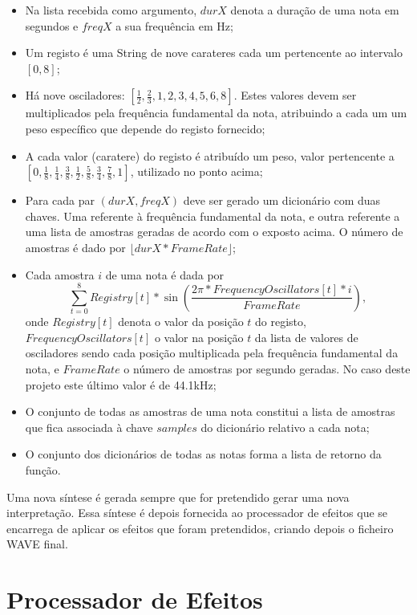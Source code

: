\documentclass[a4paper,11pt,openright,oneside]{report}
\begin{document}
\begin{itemize}
\item Na lista recebida como argumento, $durX$ denota a duração de uma nota em segundos e $freqX$ a sua frequência em Hz;
\item Um registo é uma String de nove carateres cada um pertencente ao intervalo $[0, 8]$;
\item Há nove osciladores: $\left[\frac{1}{2}, \frac{2}{3}, 1, 2, 3, 4, 5, 6, 8\right]$. Estes valores devem ser multiplicados pela frequência fundamental da nota, atribuindo a cada um um peso específico que depende do registo fornecido;
\item A cada valor (caratere) do registo é atribuído um peso, valor pertencente a $\left[0, \frac{1}{8}, \frac{1}{4}, \frac{3}{8}, \frac{1}{2}, \frac{5}{8}, \frac{3}{4}, \frac{7}{8}, 1\right]$, utilizado no ponto acima;
\item Para cada par $(durX, freqX)$ deve ser gerado um dicionário com duas chaves. Uma referente à frequência fundamental da nota, e outra referente a uma lista de amostras geradas de acordo com o exposto acima. O número de amostras é dado por $\lfloor durX * FrameRate \rfloor$;
\item Cada amostra $i$ de uma nota é dada por
$$\sum_{t=0}^8 Registry[t] * \sin \left(\frac{2\pi * FrequencyOscillators[t] * i}{FrameRate}\right),$$
onde $Registry[t]$ denota o valor da posição $t$ do registo, $FrequencyOscillators[t]$ o valor na posição $t$ da lista de valores de osciladores sendo cada posição multiplicada pela frequência fundamental da nota, e $FrameRate$ o número de amostras por segundo geradas. No caso deste projeto este último valor é de 44.1kHz;
\item O conjunto de todas as amostras de uma nota constitui a lista de amostras que fica associada à chave $samples$ do dicionário relativo a cada nota;
\item O conjunto dos dicionários de todas as notas forma a lista de retorno da função.
\end{itemize}

Uma nova síntese é gerada sempre que for pretendido gerar uma nova interpretação. Essa síntese é depois fornecida ao processador de efeitos que se encarrega de aplicar os efeitos que foram pretendidos, criando depois o ficheiro WAVE final.

\section{Processador de Efeitos}
\label{sec:effects}
\end{document}
